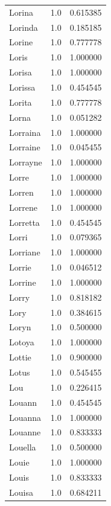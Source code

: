 \documentclass[
  letterpaper,
  DIV=11,
  numbers=noendperiod]{scrreprt}
\begin{document}
\begin{tabular}{lrr}
Lorina          &   1.0 &   0.615385 \\
Lorinda         &   1.0 &   0.185185 \\
Lorine          &   1.0 &   0.777778 \\
Loris           &   1.0 &   1.000000 \\
Lorisa          &   1.0 &   1.000000 \\
Lorissa         &   1.0 &   0.454545 \\
Lorita          &   1.0 &   0.777778 \\
Lorna           &   1.0 &   0.051282 \\
Lorraina        &   1.0 &   1.000000 \\
Lorraine        &   1.0 &   0.045455 \\
Lorrayne        &   1.0 &   1.000000 \\
Lorre           &   1.0 &   1.000000 \\
Lorren          &   1.0 &   1.000000 \\
Lorrene         &   1.0 &   1.000000 \\
Lorretta        &   1.0 &   0.454545 \\
Lorri           &   1.0 &   0.079365 \\
Lorriane        &   1.0 &   1.000000 \\
Lorrie          &   1.0 &   0.046512 \\
Lorrine         &   1.0 &   1.000000 \\
Lorry           &   1.0 &   0.818182 \\
Lory            &   1.0 &   0.384615 \\
Loryn           &   1.0 &   0.500000 \\
Lotoya          &   1.0 &   1.000000 \\
Lottie          &   1.0 &   0.900000 \\
Lotus           &   1.0 &   0.545455 \\
Lou             &   1.0 &   0.226415 \\
Louann          &   1.0 &   0.454545 \\
Louanna         &   1.0 &   1.000000 \\
Louanne         &   1.0 &   0.833333 \\
Louella         &   1.0 &   0.500000 \\
Louie           &   1.0 &   1.000000 \\
Louis           &   1.0 &   0.833333 \\
Louisa          &   1.0 &   0.684211 \\

\end{tabular}
\end{document}
